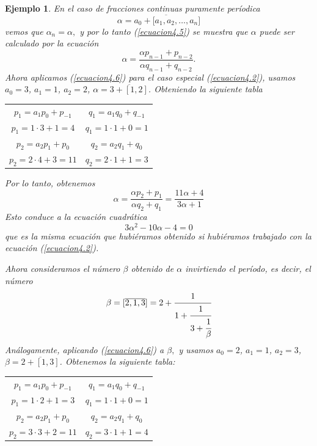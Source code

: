 \documentclass[12pt]{report}
\newtheorem{ejem}{Ejemplo}[section]
\begin{document}
\begin{ejem}
    En el caso de fracciones continuas puramente períodica
    $$
    \alpha = \overline{a_{0}+[a_{1},a_{2},\ldots,a_{n}}]
    $$
    vemos que $\alpha_{n} = \alpha,$
    y por lo tanto (\ref{ecuacion4.5}) se muestra que $\alpha$ puede ser calculado por la ecuación
    \begin{equation}
        \alpha=\frac{\alpha p_{n-1}+p_{n-2}}{\alpha q_{n-1}+q_{n-2}}.
        \label{ecuacion4.6}
    \end{equation}
    Ahora aplicamos (\ref{ecuacion4.6}) para el caso especial (\ref{ecuacion4.2}), usamos $a_{0}=3$, $a_{1}=1$, $a_{2}=2$, $\alpha=\overline{3+[1,2]}$. Obteniendo la siguiente tabla
    \begin{table}[h]
    \begin{center}
    \begin{tabular}{| c | c |}
    \hline
    $p_{1}=a_{1}p_{0}+p_{-1}$ & $q_{1}=a_{1}q_{0}+q_{-1}$ \\ 
    $p_{1}=1\cdot3+1=4$ & $q_{1}=1\cdot1+0=1$ \\\hline
    $p_{2}=a_{2}p_{1}+p_{0}$ & $q_{2}=a_{2}q_{1}+q_{0}$ \\
    $p_{2}=2\cdot4+3=11$ & $q_{2}=2\cdot1+1=3$ \\\hline
    \end{tabular}
    \label{tab:reducidas}
    \end{center}
    \end{table}
    
    Por lo tanto, obtenemos
    $$
    \alpha=\frac{\alpha p_{2}+p_{1}}{\alpha q_{2}+q_{1}}=\frac{11 \alpha+4}{3 \alpha+1}
    $$
    Esto conduce a la ecuación cuadrática
    \begin{equation}
    3 \alpha^{2}-10 \alpha-4=0 
    \label{ecuacion4.7}
    \end{equation}
    que es la misma ecuación que hubiéramos obtenido si hubiéramos trabajado con la ecuación (\ref{ecuacion4.2}).
    
    Ahora consideramos el número $\beta$ obtenido de $\alpha$ invirtiendo el período, es decir, el número
    $$
    \beta=[\overline{2,1,3}]=2+\cfrac{1}{1+\cfrac{1}{3+\cfrac{1}{\beta}}}
    $$
    Análogamente, aplicando (\ref{ecuacion4.6}) a $\beta,$ y usamos $a_{0}=2$, $a_{1}=1$, $a_{2}=3$, $\beta=\overline{2+[1,3]}$. Obtenemos la siguiente tabla:
    \begin{table}[h]
    \begin{center}
    \begin{tabular}{| c | c |}
    \hline
    $p_{1}=a_{1}p_{0}+p_{-1}$ & $q_{1}=a_{1}q_{0}+q_{-1}$ \\ 
    $p_{1}=1\cdot2+1=3$ & $q_{1}=1\cdot1+0=1$ \\\hline
    $p_{2}=a_{2}p_{1}+p_{0}$ & $q_{2}=a_{2}q_{1}+q_{0}$ \\
    $p_{2}=3\cdot3+2=11$ & $q_{2}=3\cdot1+1=4$ \\\hline
    \end{tabular}
    \label{tab:reducidas}
    \end{center}
    \end{table}
    

\end{ejem}
\end{document}
